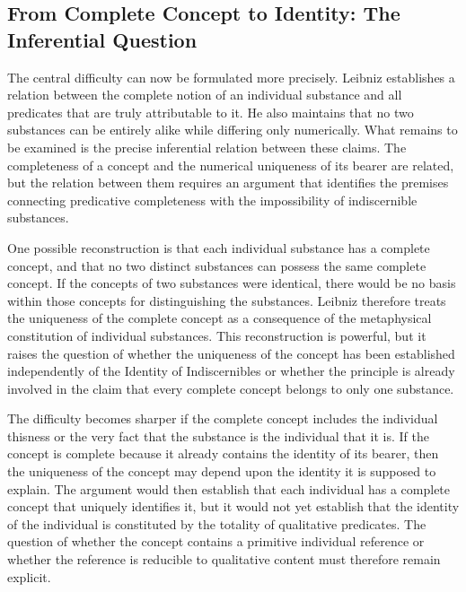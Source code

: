 \subsection{From Complete Concept to Identity: The Inferential Question}
\label{subsec:ch08-leibniz-inferential-question}

\label{para:VS.B01.P01.C08.S07.SS09.P001}

The central difficulty can now be formulated more
precisely. Leibniz establishes a relation between
the complete notion of an individual substance
and all predicates that are truly attributable
to it. He also maintains that no two substances
can be entirely alike while differing only
numerically. What remains to be examined is
the precise inferential relation between
these claims. The completeness of a concept
and the numerical uniqueness of its bearer
are related, but the relation between them
requires an argument that identifies the
premises connecting predicative completeness
with the impossibility of indiscernible
substances. \cite[§§8--9]{LeibnizDiscourse}
\cite{LookLeibnizSEP2020}

\label{para:VS.B01.P01.C08.S07.SS09.P002}

One possible reconstruction is that each
individual substance has a complete concept,
and that no two distinct substances can
possess the same complete concept. If the
concepts of two substances were identical,
there would be no basis within those concepts
for distinguishing the substances. Leibniz
therefore treats the uniqueness of the
complete concept as a consequence of
the metaphysical constitution of individual
substances. This reconstruction is powerful,
but it raises the question of whether the
uniqueness of the concept has been established
independently of the Identity of Indiscernibles
or whether the principle is already involved
in the claim that every complete concept
belongs to only one substance. \cite{LookLeibnizSEP2020}

\label{para:VS.B01.P01.C08.S07.SS09.P003}

The difficulty becomes sharper if the complete
concept includes the individual thisness
or the very fact that the substance is
the individual that it is. If the concept
is complete because it already contains
the identity of its bearer, then the
uniqueness of the concept may depend upon
the identity it is supposed to explain.
The argument would then establish that
each individual has a complete concept
that uniquely identifies it, but it would
not yet establish that the identity of
the individual is constituted by the
totality of qualitative predicates.
The question of whether the concept
contains a primitive individual reference
or whether the reference is reducible
to qualitative content must therefore
remain explicit. \cite{AdamsPrimitiveThisness1979}
\cite{RodriguezPereyraIdentitySEP2025}

